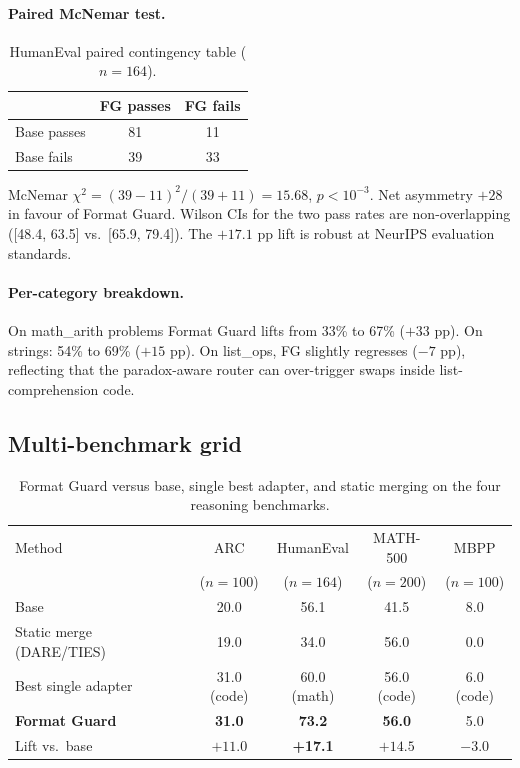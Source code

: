 \documentclass{article}
\begin{document}
\paragraph{Paired McNemar test.}

\begin{table}[h]
  \caption{HumanEval paired contingency table ($n=164$).}
  \label{tab:humaneval-mcnemar}
  \centering
  \begin{tabular}{lcc}
    \toprule
    & FG passes & FG fails \\
    \midrule
    Base passes & 81 & 11 \\
    Base fails  & 39 &  33 \\
    \bottomrule
  \end{tabular}
\end{table}

McNemar $\chi^2 = (39 - 11)^2 / (39 + 11) = 15.68$, $p < 10^{-3}$. Net asymmetry $+28$ in favour of Format Guard. Wilson CIs for the two pass rates are non-overlapping ([48.4, 63.5] vs.\ [65.9, 79.4]). The $+17.1$ pp lift is robust at NeurIPS evaluation standards.

\paragraph{Per-category breakdown.} On math\_arith problems Format Guard lifts from 33\% to 67\% ($+33$ pp). On strings: 54\% to 69\% ($+15$ pp). On list\_ops, FG slightly regresses ($-7$ pp), reflecting that the paradox-aware router can over-trigger swaps inside list-comprehension code.

\subsection{Multi-benchmark grid}

\begin{table}[h]
  \caption{Format Guard versus base, single best adapter, and static merging on the four reasoning benchmarks.}
  \label{tab:fg-grid}
  \centering
  \begin{tabular}{lcccc}
    \toprule
    Method & ARC & HumanEval & MATH-500 & MBPP \\
    & ($n{=}100$) & ($n{=}164$) & ($n{=}200$) & ($n{=}100$) \\
    \midrule
    Base & 20.0 & 56.1 & 41.5 & 8.0 \\
    Static merge (DARE/TIES) & 19.0 & 34.0 & 56.0 & 0.0 \\
    Best single adapter & 31.0 (code) & 60.0 (math) & 56.0 (code) & 6.0 (code) \\
    \textbf{Format Guard} & \textbf{31.0} & \textbf{73.2} & \textbf{56.0} & 5.0 \\
    Lift vs.\ base & $+11.0$ & \textbf{+17.1} & $+14.5$ & $-3.0$ \\
    \bottomrule
  \end{tabular}
\end{table}
\end{document}
